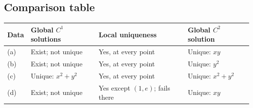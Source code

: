 \documentclass[11pt,a4paper]{article}
\begin{document}
\subsection*{Comparison table}
\begin{center}
\small
\begin{tabular}{@{}p{.08\linewidth}p{.27\linewidth}p{.30\linewidth}p{.23\linewidth}@{}}
\toprule
Data & Global $C^1$ solutions & Local uniqueness & Global $C^2$ solution\\
\midrule
(a) & Exist; not unique & Yes, at every point & Unique: $xy$\\[5pt]
(b) & Exist; not unique & Yes, at every point & Unique: $y^2$\\[5pt]
(c) & Unique: $x^2+y^2$ & Yes, at every point & Unique: $x^2+y^2$\\[5pt]
(d) & Exist; not unique & Yes except $(1,e)$; fails there & Unique: $xy$\\
\bottomrule
\end{tabular}
\end{center}
\end{document}
